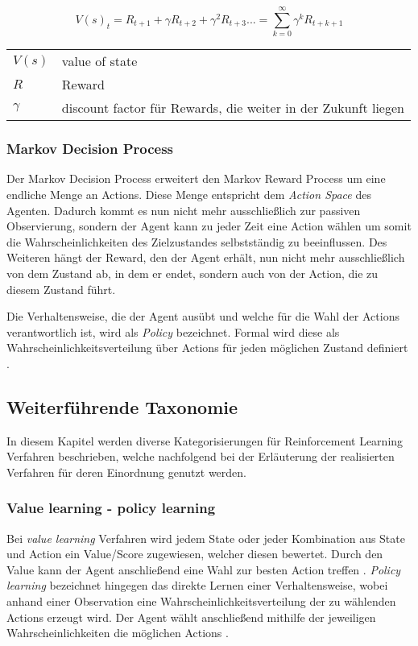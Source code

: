 \documentclass[11pt]{scrartcl}
\makeatletter
\newenvironment{conditions}
  {\par\vspace{\abovedisplayskip}\noindent\begin{tabular}{>{$}l<{$} @{${}:{}$} l}}
  {\end{tabular}\par\vspace{\belowdisplayskip}}
\makeatother
\begin{document}
\begin{equation}
V(s)_t = R_{t+1} + \gamma R_{t+2} + \gamma^2 R_{t+3} ... = \sum_{k=0}^\infty \gamma^{k} R_{t+k+1}
\label{eq:value-of-state}
\end{equation} 

\begin{conditions}
 V(s)     	&  value of state \\
 R	     	&  Reward \\   
 \gamma 	&  discount factor für Rewards, die weiter in der Zukunft liegen
\end{conditions}


\subsubsection{Markov Decision Process}
Der Markov Decision Process erweitert den Markov Reward Process um eine endliche Menge an Actions.
Diese Menge entspricht dem \textit{Action Space} des Agenten. Dadurch kommt es nun nicht mehr
ausschließlich zur passiven Observierung, sondern der Agent kann zu jeder Zeit eine Action wählen um
somit die Wahrscheinlichkeiten des Zielzustandes selbstständig zu beeinflussen. Des Weiteren hängt 
der Reward, den der Agent erhält, nun nicht mehr ausschließlich von dem Zustand ab, in dem er endet,
sondern auch von der Action, die zu diesem Zustand führt. 

Die Verhaltensweise, die der Agent ausübt und welche für die Wahl der Actions verantwortlich ist,
wird als \textit{Policy} bezeichnet. Formal wird diese als Wahrscheinlichkeitsverteilung
über Actions für jeden möglichen Zustand definiert \cite[~S.22 f.]{L2018}.  %


\subsection{Weiterführende Taxonomie}
In diesem Kapitel werden diverse Kategorisierungen für Reinforcement Learning Verfahren beschrieben,
welche nachfolgend bei der Erläuterung der realisierten Verfahren für deren Einordnung genutzt werden.  


\subsubsection{Value learning - policy learning}
Bei \textit{value learning} Verfahren wird jedem State oder jeder Kombination aus State und Action ein
Value/Score zugewiesen, welcher diesen bewertet. Durch den Value kann der Agent anschließend eine
Wahl zur besten Action treffen \cite[~S.NA]{L2018}. \textit{Policy learning} bezeichnet hingegen das
direkte Lernen einer Verhaltensweise, wobei anhand einer Observation eine Wahrscheinlichkeitsverteilung
der zu wählenden Actions erzeugt wird. Der Agent wählt anschließend mithilfe der jeweiligen
Wahrscheinlichkeiten die möglichen Actions \cite[~S.NA]{L2018}.
\end{document}
